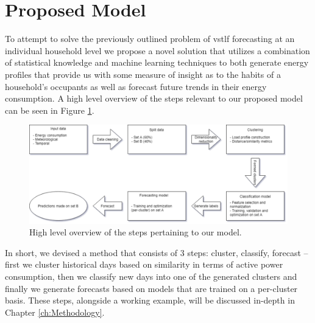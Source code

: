 \section{Proposed Model}
\label{sec:Introduction:Propose-Model}
To attempt to solve the previously outlined problem of \gls{vstlf} forecasting at an individual household level we propose a novel solution that utilizes a combination of statistical knowledge and machine learning techniques to both generate energy profiles that provide us with some measure of insight as to the habits of a household's occupants as well as forecast future trends in their energy consumption. A high level overview of the steps relevant to our proposed model can be seen in Figure \ref{fig:Proposed-Model-1}.

\null \vspace{0.5em}

\begin{figure}[H]
    \begin{adjustwidth}{-3.0cm}{-3.0cm}%
        \centering
        \includegraphics[width=\linewidth]{Images/Chapter 1/Other/High Level Model.pdf}
        \caption{High level overview of the steps pertaining to our model.}
        \label{fig:Proposed-Model-1}
    \end{adjustwidth}
\end{figure}

\noindent \newline In short, we devised a method that consists of 3 steps: cluster, classify, forecast -- first we cluster historical days based on similarity in terms of active power consumption, then we classify new days into one of the generated clusters and finally we generate forecasts based on models that are trained on a per-cluster basis. These steps, alongside a working example, will be discussed in-depth in Chapter \ref{ch:Methodology}.